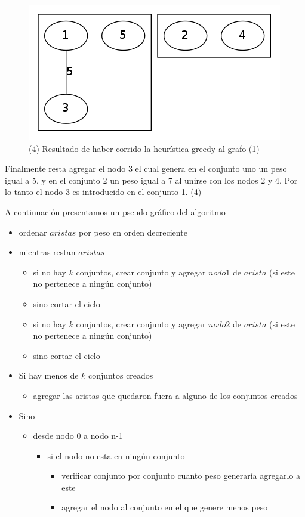 \begin{figure}[H]
\begin{center}
\includegraphics[scale=0.4]{./img/greedy4.png}
\caption{(4) Resultado de haber corrido la heurística greedy al grafo (1)}
\end{center}
\end{figure}
Finalmente resta agregar el nodo 3 el cual genera en el conjunto uno un peso igual a 5, y en el conjunto 2 un peso igual a 7 al unirse con los nodos 2 y 4. Por lo tanto el nodo 3 es introducido en el conjunto 1. (4)


A continuación presentamos un pseudo-gráfico del algoritmo
\begin{itemize}
\item ordenar $aristas$ por peso en orden decreciente
\item mientras restan $aristas$ 
  \begin{itemize}
  \item si no hay $k$ conjuntos, crear conjunto y agregar $nodo1$ de $arista$ (si este no pertenece a ningún conjunto)
  \item sino cortar el ciclo  
  \item si no hay $k$ conjuntos, crear conjunto y agregar $nodo2$ de $arista$ (si este no pertenece a ningún conjunto)
  \item sino cortar el ciclo  
  \end{itemize}
\item Si hay menos de $k$ conjuntos creados
  \begin{itemize}
  \item agregar las aristas que quedaron fuera a alguno de los conjuntos creados
  \end{itemize}
\item Sino
  \begin{itemize}
  \item desde nodo 0 a nodo n-1
    \begin{itemize}
    \item si el nodo no esta en ningún conjunto
      \begin{itemize}
        \item verificar conjunto por conjunto cuanto peso generaría agregarlo a este
        \item agregar el nodo al conjunto en el que genere menos peso
      \end{itemize}
    \end{itemize}
  \end{itemize}
\end{itemize}




